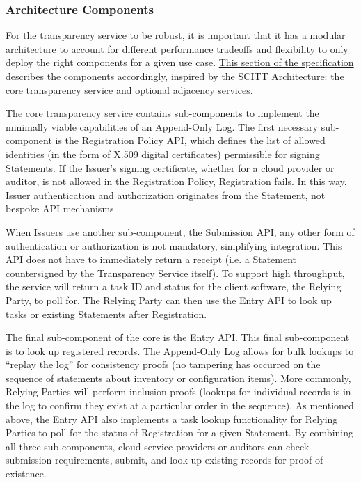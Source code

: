 \documentclass{jdf}
\begin{document}
\subsubsection{Architecture Components}

For the transparency service to be robust, it is important that it has a modular architecture to account for different performance tradeoffs and flexibility to only deploy the right components for a given use case. \href{https://aj-stein.github.io/conmotion/architecture.html#components}{This section of the specification} describes the components accordingly, inspired by the SCITT Architecture: the core transparency service and optional adjacency services.

The core transparency service contains sub-components to implement the minimally viable capabilities of an Append-Only Log. The first necessary sub-component is the Registration Policy API, which defines the list of allowed identities (in the form of X.509 digital certificates) permissible for signing Statements. If the Issuer's signing certificate, whether for a cloud provider or auditor, is not allowed in the Registration Policy, Registration fails. In this way, Issuer authentication and authorization originates from the Statement, not bespoke API mechanisms.

When Issuers use another sub-component, the Submission API, any other form of authentication or authorization is not mandatory, simplifying integration. This API does not have to immediately return a receipt (i.e. a Statement countersigned by the Transparency Service itself). To support high throughput, the service will return a task ID and status for the client software, the Relying Party, to poll for. The Relying Party can then use the Entry API to look up tasks or existing Statements after Registration. 

The final sub-component of the core is the Entry API. This final sub-component is to look up registered records. The Append-Only Log allows for bulk lookups to ``replay the log'' for consistency proofs (no tampering has occurred on the sequence of statements about inventory or configuration items). More commonly, Relying Parties will perform inclusion proofs (lookups for individual records is in the log to confirm they exist at a particular order in the sequence). As mentioned above, the Entry API also implements a task lookup functionality for Relying Parties to poll for the status of Registration for a given Statement. By combining all three sub-components, cloud service providers or auditors can check submission requirements, submit, and look up existing records for proof of existence.
\end{document}
